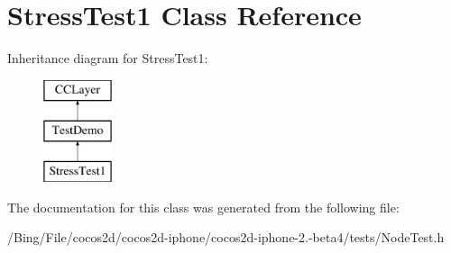 \hypertarget{interface_stress_test1}{\section{Stress\-Test1 Class Reference}
\label{interface_stress_test1}
}
Inheritance diagram for Stress\-Test1\-:\begin{figure}[H]
\begin{center}
\leavevmode
\includegraphics[height=3.000000cm]{interface_stress_test1}
\end{center}
\end{figure}


The documentation for this class was generated from the following file\-:\begin{DoxyCompactItemize}
\item 
/\-Bing/\-File/cocos2d/cocos2d-\/iphone/cocos2d-\/iphone-\/2.-\/beta4/tests/Node\-Test.\-h\end{DoxyCompactItemize}
